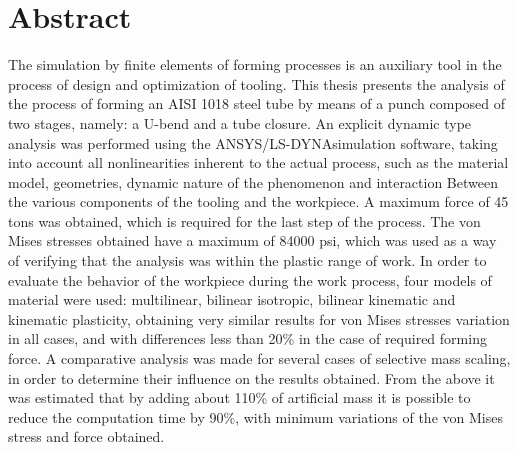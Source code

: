 \chapter*{Abstract}

The simulation by finite elements of forming processes is an auxiliary tool in the process of design and optimization of tooling. This thesis presents the analysis of the process of forming an AISI 1018 steel tube by means of a punch composed of two stages, namely: a U-bend and a tube closure. An explicit dynamic type analysis was performed using the ANSYS/LS-DYNA\CR simulation software, taking into account all nonlinearities inherent to the actual process, such as the material model, geometries, dynamic nature of the phenomenon and interaction Between the various components of the tooling and the workpiece. A maximum force of 45 tons was obtained, which is required for the last step of the process. The von Mises stresses obtained have a maximum of 84000 psi, which was used as a way of verifying that the analysis was within the plastic range of work. In order to evaluate the behavior of the workpiece during the work process, four models of material were used: multilinear, bilinear isotropic, bilinear kinematic and kinematic plasticity, obtaining very similar results for von Mises stresses variation in all cases, and with differences less than 20\% in the case of required forming force. A comparative analysis was made for several cases of selective mass scaling, in order to determine their influence on the results obtained. From the above it was estimated that by adding about 110\% of artificial mass it is possible to reduce the computation time by 90\%, with minimum variations of the von Mises stress and force obtained.